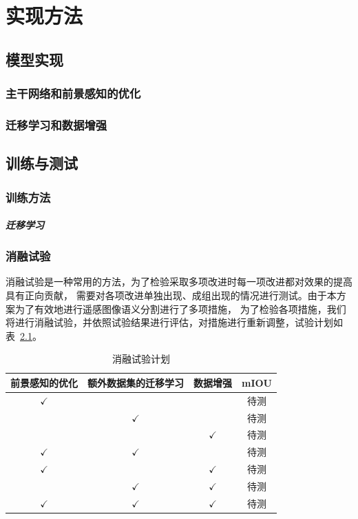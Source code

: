 \documentclass[a4paper,twoside,zihao=5,UTF8]{ctexrep}
\begin{document}
\part{实现方法}

\chapter{模型实现}

\section{主干网络和前景感知的优化}
\blindtext

\section{迁移学习和数据增强}
\blindtext

\chapter{训练与测试}

\section{训练方法}


\subsubsection{迁移学习}



\section{消融试验}

消融试验是一种常用的方法，为了检验采取多项改进时每一项改进都对效果的提高具有正向贡献，
需要对各项改进单独出现、成组出现的情况进行测试。由于本方案为了有效地进行遥感图像语义分割进行了多项措施，
为了检验各项措施，我们将进行消融试验，并依照试验结果进行评估，对措施进行重新调整，试验计划如表~\ref{tbl:ablexpr}。

\begin{table}[htbp]
    \centering
    \caption{消融试验计划}
    \label{tbl:ablexpr}
    \renewcommand\arraystretch{1.5}
    \begin{tabular}{ccc|c}
        \toprule
        \hline
        前景感知的优化 & 额外数据集的迁移学习 & 数据增强 & mIOU\\
        \hline
        $\checkmark$ & \ & \ & 待测 \\
        \ & $\checkmark$ & \ & 待测  \\
        \ & \ & $\checkmark$ & 待测  \\
        $\checkmark$ & $\checkmark$ & \ & 待测  \\
        $\checkmark$ & \ & $\checkmark$ & 待测  \\
        \ & $\checkmark$ & $\checkmark$ & 待测  \\
        $\checkmark$ & $\checkmark$ & $\checkmark$ & 待测 \\
        \hline
        \bottomrule
    \end{tabular}
\end{table}
\end{document}
